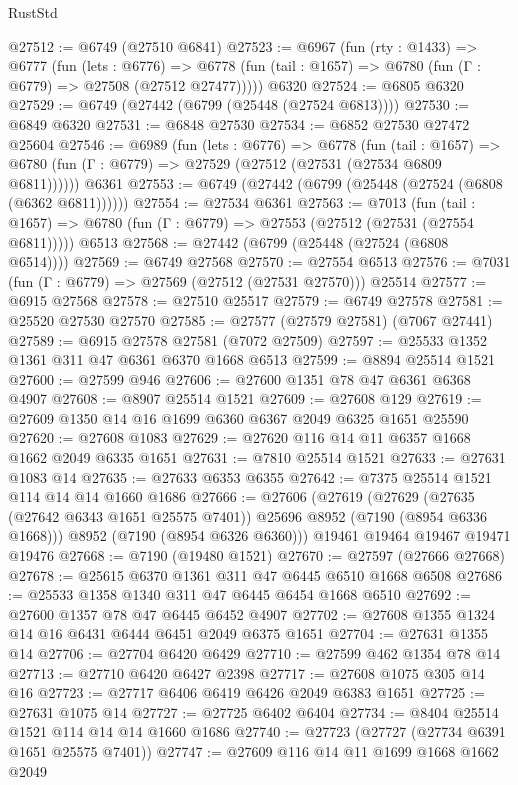 \begin{lexlean}{RustStd}
\begin{coremodule}
@27512 := @6749 (@27510 @6841)
@27523 := @6967
    (fun (rty : @1433) =>
    @6777
      (fun (lets : @6776) =>
      @6778 (fun (tail : @1657) => @6780 (fun (Γ : @6779) => @27508 (@27512 @27477)))))
    @6320
@27524 := @6805 @6320
@27529 := @6749 (@27442 (@6799 (@25448 (@27524 @6813))))
@27530 := @6849 @6320
@27531 := @6848 @27530
@27534 := @6852 @27530 @27472 @25604
@27546 := @6989
    (fun (lets : @6776) =>
    @6778
      (fun (tail : @1657) =>
      @6780 (fun (Γ : @6779) => @27529 (@27512 (@27531 (@27534 @6809 @6811))))))
    @6361
@27553 := @6749 (@27442 (@6799 (@25448 (@27524 (@6808 (@6362 @6811))))))
@27554 := @27534 @6361
@27563 := @7013
    (fun (tail : @1657) => @6780 (fun (Γ : @6779) => @27553 (@27512 (@27531 (@27554 @6811)))))
    @6513
@27568 := @27442 (@6799 (@25448 (@27524 (@6808 @6514))))
@27569 := @6749 @27568
@27570 := @27554 @6513
@27576 := @7031 (fun (Γ : @6779) => @27569 (@27512 (@27531 @27570))) @25514
@27577 := @6915 @27568
@27578 := @27510 @25517
@27579 := @6749 @27578
@27581 := @25520 @27530 @27570
@27585 := @27577 (@27579 @27581) (@7067 @27441)
@27589 := @6915 @27578 @27581 (@7072 @27509)
@27597 := @25533 @1352 @1361 @311 @47 @6361 @6370 @1668 @6513
@27599 := @8894 @25514 @1521
@27600 := @27599 @946
@27606 := @27600 @1351 @78 @47 @6361 @6368 @4907
@27608 := @8907 @25514 @1521
@27609 := @27608 @129
@27619 := @27609 @1350 @14 @16 @1699 @6360 @6367 @2049 @6325 @1651 @25590
@27620 := @27608 @1083
@27629 := @27620 @116 @14 @11 @6357 @1668 @1662 @2049 @6335 @1651
@27631 := @7810 @25514 @1521
@27633 := @27631 @1083 @14
@27635 := @27633 @6353 @6355
@27642 := @7375 @25514 @1521 @114 @14 @14 @1660 @1686
@27666 := @27606
    (@27619
      (@27629 (@27635 (@27642 @6343 @1651 @25575 @7401)) @25696 @8952 (@7190 (@8954 @6336 @1668)))
      @8952
      (@7190 (@8954 @6326 @6360)))
    @19461
    @19464
    @19467
    @19471
    @19476
@27668 := @7190 (@19480 @1521)
@27670 := @27597 (@27666 @27668)
@27678 := @25615 @6370 @1361 @311 @47 @6445 @6510 @1668 @6508
@27686 := @25533 @1358 @1340 @311 @47 @6445 @6454 @1668 @6510
@27692 := @27600 @1357 @78 @47 @6445 @6452 @4907
@27702 := @27608 @1355 @1324 @14 @16 @6431 @6444 @6451 @2049 @6375 @1651
@27704 := @27631 @1355 @14
@27706 := @27704 @6420 @6429
@27710 := @27599 @462 @1354 @78 @14
@27713 := @27710 @6420 @6427 @2398
@27717 := @27608 @1075 @305 @14 @16
@27723 := @27717 @6406 @6419 @6426 @2049 @6383 @1651
@27725 := @27631 @1075 @14
@27727 := @27725 @6402 @6404
@27734 := @8404 @25514 @1521 @114 @14 @14 @1660 @1686
@27740 := @27723 (@27727 (@27734 @6391 @1651 @25575 @7401))
@27747 := @27609 @116 @14 @11 @1699 @1668 @1662 @2049

\end{coremodule}
\end{lexlean}
